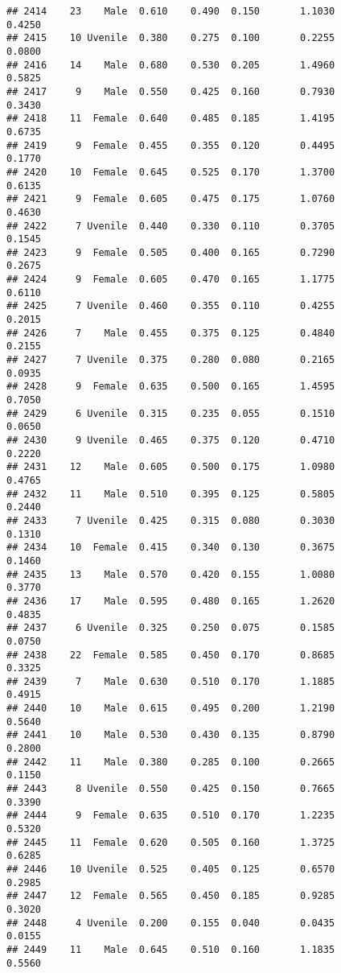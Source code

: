 \documentclass[
]{article}
\begin{document}
\begin{verbatim}
## 2414    23    Male  0.610    0.490  0.150       1.1030         0.4250
## 2415    10 Uvenile  0.380    0.275  0.100       0.2255         0.0800
## 2416    14    Male  0.680    0.530  0.205       1.4960         0.5825
## 2417     9    Male  0.550    0.425  0.160       0.7930         0.3430
## 2418    11  Female  0.640    0.485  0.185       1.4195         0.6735
## 2419     9  Female  0.455    0.355  0.120       0.4495         0.1770
## 2420    10  Female  0.645    0.525  0.170       1.3700         0.6135
## 2421     9  Female  0.605    0.475  0.175       1.0760         0.4630
## 2422     7 Uvenile  0.440    0.330  0.110       0.3705         0.1545
## 2423     9  Female  0.505    0.400  0.165       0.7290         0.2675
## 2424     9  Female  0.605    0.470  0.165       1.1775         0.6110
## 2425     7 Uvenile  0.460    0.355  0.110       0.4255         0.2015
## 2426     7    Male  0.455    0.375  0.125       0.4840         0.2155
## 2427     7 Uvenile  0.375    0.280  0.080       0.2165         0.0935
## 2428     9  Female  0.635    0.500  0.165       1.4595         0.7050
## 2429     6 Uvenile  0.315    0.235  0.055       0.1510         0.0650
## 2430     9 Uvenile  0.465    0.375  0.120       0.4710         0.2220
## 2431    12    Male  0.605    0.500  0.175       1.0980         0.4765
## 2432    11    Male  0.510    0.395  0.125       0.5805         0.2440
## 2433     7 Uvenile  0.425    0.315  0.080       0.3030         0.1310
## 2434    10  Female  0.415    0.340  0.130       0.3675         0.1460
## 2435    13    Male  0.570    0.420  0.155       1.0080         0.3770
## 2436    17    Male  0.595    0.480  0.165       1.2620         0.4835
## 2437     6 Uvenile  0.325    0.250  0.075       0.1585         0.0750
## 2438    22  Female  0.585    0.450  0.170       0.8685         0.3325
## 2439     7    Male  0.630    0.510  0.170       1.1885         0.4915
## 2440    10    Male  0.615    0.495  0.200       1.2190         0.5640
## 2441    10    Male  0.530    0.430  0.135       0.8790         0.2800
## 2442    11    Male  0.380    0.285  0.100       0.2665         0.1150
## 2443     8 Uvenile  0.550    0.425  0.150       0.7665         0.3390
## 2444     9  Female  0.635    0.510  0.170       1.2235         0.5320
## 2445    11  Female  0.620    0.505  0.160       1.3725         0.6285
## 2446    10 Uvenile  0.525    0.405  0.125       0.6570         0.2985
## 2447    12  Female  0.565    0.450  0.185       0.9285         0.3020
## 2448     4 Uvenile  0.200    0.155  0.040       0.0435         0.0155
## 2449    11    Male  0.645    0.510  0.160       1.1835         0.5560

\end{verbatim}
\end{document}
